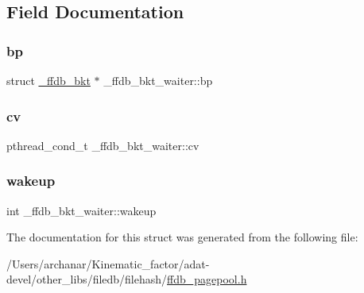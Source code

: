 \subsection{Field Documentation}
\mbox{\label{struct__ffdb__bkt__waiter_ad0a79a0bbf4f48827956b35c98b14b23}} 
\subsubsection{\texorpdfstring{bp}{bp}}
{\footnotesize\ttfamily struct \mbox{\hyperlink{struct__ffdb__bkt}{\+\_\+ffdb\+\_\+bkt}} $\ast$ \+\_\+ffdb\+\_\+bkt\+\_\+waiter\+::bp}

\mbox{\label{struct__ffdb__bkt__waiter_a508c044094f22ad3c61725a3719147f3}} 
\subsubsection{\texorpdfstring{cv}{cv}}
{\footnotesize\ttfamily pthread\+\_\+cond\+\_\+t \+\_\+ffdb\+\_\+bkt\+\_\+waiter\+::cv}

\mbox{\label{struct__ffdb__bkt__waiter_a9677f7593396ca503610bd92c4430835}} 
\subsubsection{\texorpdfstring{wakeup}{wakeup}}
{\footnotesize\ttfamily int \+\_\+ffdb\+\_\+bkt\+\_\+waiter\+::wakeup}



The documentation for this struct was generated from the following file\+:\begin{DoxyCompactItemize}
\item 
/\+Users/archanar/\+Kinematic\+\_\+factor/adat-\/devel/other\+\_\+libs/filedb/filehash/\mbox{\hyperlink{adat-devel_2other__libs_2filedb_2filehash_2ffdb__pagepool_8h}{ffdb\+\_\+pagepool.\+h}}\end{DoxyCompactItemize}
